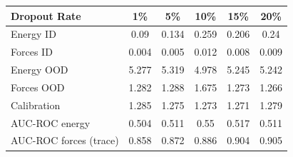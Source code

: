 \begin{tabular}{lccccc}
\toprule
{Dropout Rate}            & 1\% & 5\% & 10\% & 15\% & 20\%  \\
\midrule
Energy ID             & 0.09 & 0.134 & 0.259 & 0.206 & 0.24  \\
Forces ID             & 0.004 & 0.005 & 0.012 & 0.008 & 0.009  \\
Energy OOD            & 5.277 & 5.319 & 4.978 & 5.245 & 5.242  \\
Forces OOD             & 1.282 & 1.288 & 1.675 & 1.273 & 1.266  \\
\midrule
Calibration           &  1.285 & 1.275 & 1.273 & 1.271 & 1.279  \\
\midrule
AUC-ROC energy         &  0.504 & 0.511 & 0.55 & 0.517 & 0.511 \\
AUC-ROC forces (trace) &  0.858 & 0.872 & 0.886 & 0.904 & 0.905  \\
\bottomrule
\end{tabular}